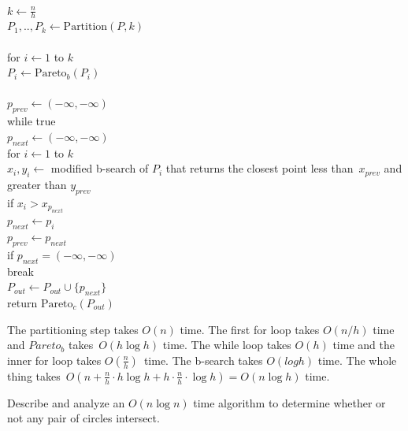 \documentclass[11pt]{article}
\begin{document}
\begin{enumerate}[(a)]
\begin{solution}
  \begin{algo}
    \+
    \\  \(k \gets \frac{n}{h}\)
    \\  \(P_1,..,P_k \gets \text{Partition}(P, k)\)
    \\
    \\  for \(i \gets 1\) to \(k\)\+
    \\   \(P_i \gets \text{Pareto}_b(P_i)\)\-
    \\
    \\  \(p_{prev} \gets (-\infty, -\infty)\)
    \\  while true\+
    \\   \(p_{next} \gets (-\infty,-\infty)\)
    \\   for \(i \gets 1\) to \(k\)\+
    \\     \(x_i, y_i \gets\) modified b-search of \(P_i\) that returns the closest point less than\
                              \(x_{prev}\) and greater than \(y_{prev}\)
    \\     if \(x_i > x_{p_{next}}\)\+
    \\       \(p_{next} \gets p_i\)\-\-
    \\   \(p_{prev} \gets p_{next}\)
    \\   if \(p_{next} = (-\infty,-\infty)\)\+
    \\     break\-
    \\  \(P_{out} \gets P_{out} \cup \{p_{next}\}\)\-
    \\  return \(\text{Pareto}_c(P_{out})\)

  \end{algo}

  The partitioning step takes \(O(n)\) time. The first for loop takes \(O(n/h)\) time and \(Pareto_b\) takes\
  \(O(h \log h)\) time. The while loop takes \(O(h)\) time and the inner for loop takes \(O(\frac{n}{h})\)\
  time. The b-search takes \(O(log h)\) time. The whole thing takes\
  \(O(n + \frac{n}{h} \cdot h \log h + h \cdot \frac{n}{h} \cdot \log h) = O(n \log h)\) time.
\end{solution}
\end{enumerate}

Describe and analyze an \(O(n \log n)\) time algorithm to determine whether or not any pair of
circles intersect.
\end{document}
